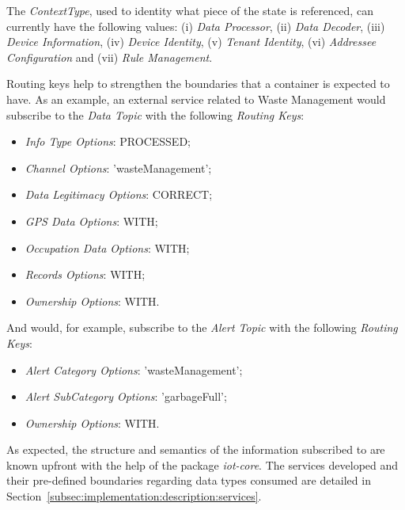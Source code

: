 The \textit{ContextType}, used to identity what piece of the state is referenced, can currently have the following values: (i) \textit{Data Processor}, (ii) \textit{Data Decoder}, (iii) \textit{Device Information}, (iv) \textit{Device Identity}, (v) \textit{Tenant Identity}, (vi) \textit{Addressee Configuration} and (vii) \textit{Rule Management}.

Routing keys help to strengthen the boundaries that a container is expected to have. As an example, an external service related to Waste Management would subscribe to the \textit{Data Topic} with the following \textit{Routing Keys}:

\begin{itemize}
   \item \textit{Info Type Options}: PROCESSED;
   \item \textit{Channel Options}: 'wasteManagement';
   \item \textit{Data Legitimacy Options}: CORRECT;
   \item \textit{GPS Data Options}: WITH;
   \item \textit{Occupation Data Options}: WITH;
   \item \textit{Records Options}: WITH;
   \item \textit{Ownership Options}: WITH.
\end{itemize}

And would, for example, subscribe to the \textit{Alert Topic} with the following \textit{Routing Keys}:

\begin{itemize}
   \item \textit{Alert Category Options}: 'wasteManagement';
   \item \textit{Alert SubCategory Options}: 'garbageFull';
   \item \textit{Ownership Options}: WITH.
\end{itemize}

As expected, the structure and semantics of the information subscribed to are known upfront with the help of the package \textit{iot-core}. The services developed and their pre-defined boundaries regarding data types consumed are detailed in Section~\ref{subsec:implementation:description:services}.

